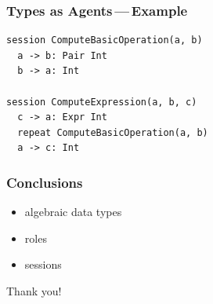 \documentclass{beamer}
\begin{document}
\begin{frame}[fragile]
\frametitle{Types as Agents\,---\,Example}
\begin{lstlisting}
session ComputeBasicOperation(a, b)
  a -> b: Pair Int
  b -> a: Int

session ComputeExpression(a, b, c)
  c -> a: Expr Int
  repeat ComputeBasicOperation(a, b)
  a -> c: Int
\end{lstlisting}
\note[item]{}
\end{frame}

\begin{frame}
\frametitle{Conclusions}
\begin{itemize}
\item \alert{algebraic data types}
\item roles
\item sessions
\end{itemize}
\end{frame}

\begin{frame}
\centerline{Thank you!}
\note[item]{}
\end{frame}
\end{document}
